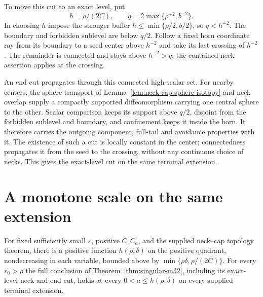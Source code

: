 To move this cut to an exact level, put
\[
 b=\rho/(2C),\qquad q=2\max\{\rho^{-2},b^{-2}\}.
\]
In choosing $h$ impose the stronger
buffer $h\leq\min\{\rho/2,b/2\}$, so $q<h^{-2}$. The boundary and
forbidden sublevel are below $q/2$. Follow a fixed horn coordinate ray
from its boundary to a seed center above $h^{-2}$ and take its last
crossing of $h^{-2}$. The remainder is connected and stays above
$h^{-2}>q$; the contained-neck assertion applies at the crossing.

An end cut propagates through this connected high-scalar set. For nearby
centers, the sphere transport of Lemma~\ref{lem:neck-cap-sphere-isotopy}
and neck overlap supply a compactly supported diffeomorphism carrying
one central sphere to the other. Scalar comparison keeps its support above
$q/2$, disjoint from the forbidden sublevel and boundary, and confinement
keeps it inside the horn. It therefore carries the outgoing component,
full-tail and avoidance properties with it. The existence of such a cut
is locally constant in the center; connectedness propagates it from the
seed to the crossing, without any continuous choice of necks. This gives
the exact-level cut on the same terminal extension
\cite[Theorem 11.31, pp. 291--292]{MT2007}.

\section{A monotone scale on the same extension}
\label{sec:singular-selector}

\begin{corollary}
\label{cor:singular-selector}
For fixed sufficiently small $\varepsilon$, positive $C,C_a$, and the
supplied neck--cap topology theorem, there is a positive function
$h(\rho,\delta)$ on the positive quadrant, nondecreasing in each
variable, bounded above by $\min\{\rho\delta,\rho/(2C)\}$.
For every $r_0>\rho$ the full conclusion of
Theorem~\ref{thm:singular-m32}, including its exact-level neck and end
cut, holds at every $0<a\leq h(\rho,\delta)$ on every supplied terminal
extension.
\end{corollary}

